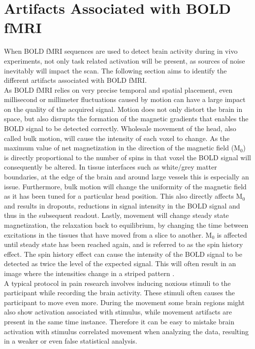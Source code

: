 \section{Artifacts Associated with BOLD fMRI} \label{sec:noise}

When BOLD fMRI sequences are used to detect brain activity during in vivo experiments, not only task related activation will be present, as sources of noise  inevitably will impact the scan. \cite{Salimi-Khorshidi2014} The following section aims to identify the different artifacts associated with BOLD fMRI. \\
As BOLD fMRI relies on very precise temporal and spatial placement, even millisecond or millimeter fluctuations caused by motion can have a large impact on the quality of the acquired signal. Motion does not only distort the brain in space, but also disrupts the formation of the magnetic gradients that enables the BOLD signal to be detected correctly. Wholesale movement of the head, also called bulk motion, will cause the intensity of each voxel to change. As the maximum value of net magnetization in the direction of the magnetic field (M$_0$) is directly proportional to the number of spins in that voxel the BOLD signal will consequently be altered. In tissue interfaces such as white/grey matter boundaries, at the edge of the brain and around large vessels this is especially an issue. Furthermore, bulk motion will change the uniformity of the magnetic field as it has been tuned for a particular head position. This also directly affects M$_0$ and results in dropouts, reductions in signal intensity in the BOLD signal and thus in the subsequent readout. Lastly, movement will change steady state magnetization, the relaxation back to equilibrium, by changing the time between excitations in the tissues that have moved from a slice to another. M$_0$ is affected until steady state has been reached again, and is referred to as the spin history effect. The spin history effect can cause the intensity of the BOLD signal to be detected as twice the level of the expected signal. \cite{Murphy2013} This will often result in an image where the intensities change in a striped pattern \cite{Poldrack2011}. \\
A typical protocol in pain research involves inducing noxious stimuli to the participant while recording the brain activity. These stimuli often causes the participant to move even more. During the movement some brain regions might also show activation associated with stimulus, while movement artifacts are present in the same time instance. Therefore it can be easy to mistake brain activation with stimulus correlated movement when analyzing the data, resulting in a weaker or even false statistical analysis. \cite{Poldrack2011} \\
